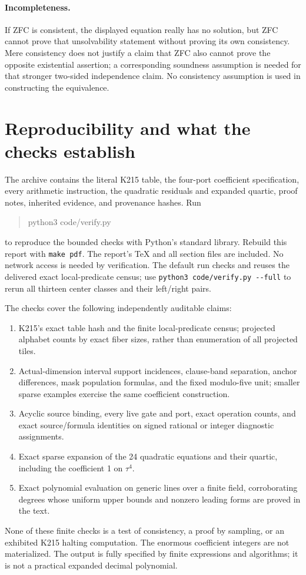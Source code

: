 \documentclass[11pt,a4paper]{article}
\theoremstyle{remark}\newtheorem{remark}[theorem]{Remark}
\begin{document}
\paragraph{Incompleteness.}
If ZFC is consistent, the displayed equation really has no solution, but
ZFC cannot prove that unsolvability statement without proving its own
consistency. Mere consistency does not justify a claim that ZFC also
cannot prove the opposite existential assertion; a corresponding
soundness assumption is needed for that stronger two-sided independence
claim. No consistency assumption is used in constructing the equivalence.

\section{Reproducibility and what the checks establish}\label{sec:checks}

The archive contains the literal K215 table, the four-port coefficient
specification, every arithmetic instruction, the quadratic residuals and
expanded quartic, proof notes, inherited evidence, and provenance hashes.
Run
\begin{quote}\ttfamily python3 code/verify.py\end{quote}
to reproduce the bounded checks with Python's standard library. Rebuild
this report with \texttt{make pdf}. The report's TeX and all section files
are included. No network access is needed by verification.
The default run checks and reuses the delivered exact local-predicate
census; use \texttt{python3 code/verify.py -{}-full} to rerun all thirteen
center classes and their left/right pairs.

The checks cover the following independently auditable claims:
\begin{enumerate}
\item K215's exact table hash and the finite local-predicate census;
projected alphabet counts by exact fiber sizes, rather than enumeration
of all projected tiles.
\item Actual-dimension interval support incidences, clause-band separation,
anchor differences, mask population formulas, and the fixed modulo-five
unit; smaller sparse examples exercise the same coefficient construction.
\item Acyclic source binding, every live gate and port, exact operation
counts, and exact source/formula identities on signed rational or integer
diagnostic assignments.
\item Exact sparse expansion of the 24 quadratic equations and their
quartic, including the coefficient 1 on \(\tau^4\).
\item Exact polynomial evaluation on generic lines over a finite field,
corroborating degrees whose uniform upper bounds and nonzero leading
forms are proved in the text.
\end{enumerate}
None of these finite checks is a test of consistency, a proof by sampling,
or an exhibited K215 halting computation. The enormous coefficient integers
are not materialized. The output is fully specified by finite expressions
and algorithms; it is not a practical expanded decimal polynomial.
\end{document}
